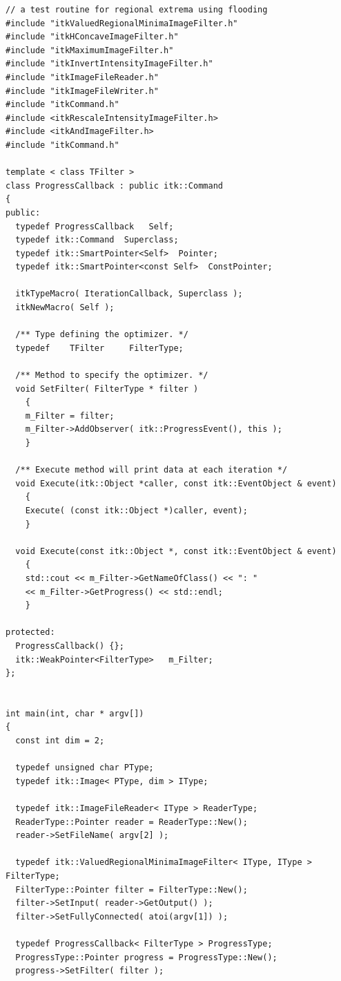 \documentclass{InsightArticle}
\begin{document}
\lstset{language=C,  basicstyle=\small}
\small \begin{verbatim}
// a test routine for regional extrema using flooding
#include "itkValuedRegionalMinimaImageFilter.h"
#include "itkHConcaveImageFilter.h"
#include "itkMaximumImageFilter.h"
#include "itkInvertIntensityImageFilter.h"
#include "itkImageFileReader.h"
#include "itkImageFileWriter.h"
#include "itkCommand.h"
#include <itkRescaleIntensityImageFilter.h>
#include <itkAndImageFilter.h>
#include "itkCommand.h"

template < class TFilter >
class ProgressCallback : public itk::Command
{
public:
  typedef ProgressCallback   Self;
  typedef itk::Command  Superclass;
  typedef itk::SmartPointer<Self>  Pointer;
  typedef itk::SmartPointer<const Self>  ConstPointer;

  itkTypeMacro( IterationCallback, Superclass );
  itkNewMacro( Self );

  /** Type defining the optimizer. */
  typedef    TFilter     FilterType;

  /** Method to specify the optimizer. */
  void SetFilter( FilterType * filter )
    {
    m_Filter = filter;
    m_Filter->AddObserver( itk::ProgressEvent(), this );
    }

  /** Execute method will print data at each iteration */
  void Execute(itk::Object *caller, const itk::EventObject & event)
    {
    Execute( (const itk::Object *)caller, event);
    }

  void Execute(const itk::Object *, const itk::EventObject & event)
    {
    std::cout << m_Filter->GetNameOfClass() << ": " 
	<< m_Filter->GetProgress() << std::endl;
    }

protected:
  ProgressCallback() {};
  itk::WeakPointer<FilterType>   m_Filter;
};


int main(int, char * argv[])
{
  const int dim = 2;
  
  typedef unsigned char PType;
  typedef itk::Image< PType, dim > IType;

  typedef itk::ImageFileReader< IType > ReaderType;
  ReaderType::Pointer reader = ReaderType::New();
  reader->SetFileName( argv[2] );

  typedef itk::ValuedRegionalMinimaImageFilter< IType, IType > FilterType;
  FilterType::Pointer filter = FilterType::New();
  filter->SetInput( reader->GetOutput() );
  filter->SetFullyConnected( atoi(argv[1]) );

  typedef ProgressCallback< FilterType > ProgressType;
  ProgressType::Pointer progress = ProgressType::New();
  progress->SetFilter( filter );


\end{verbatim}
\end{document}
